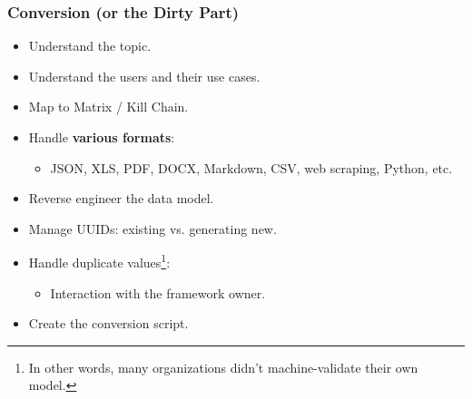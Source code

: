 \begin{frame}
        \frametitle{Conversion (or the Dirty Part)}
        \begin{itemize}
            \item Understand the topic.
            \item Understand the users and their use cases.
            \item Map to Matrix / Kill Chain.
            \item Handle \textbf{various formats}:
                \begin{itemize}
                    \item JSON, XLS, PDF, DOCX, Markdown, CSV, web scraping, Python, etc.
                \end{itemize}
            \item Reverse engineer the data model.
            \item Manage UUIDs: existing vs. generating new.
            \item Handle duplicate values\footnote{In other words, many organizations didn’t machine-validate their own model.}:
                \begin{itemize}
                    \item Interaction with the framework owner.
                \end{itemize}
            \item Create the conversion script.
        \end{itemize}
\end{frame}

